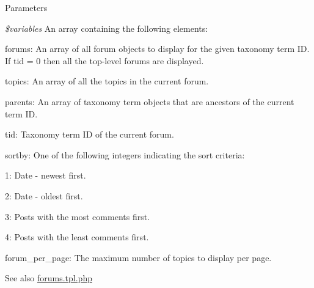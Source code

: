 \begin{DoxyParams}{Parameters}
\item[{\em \$variables}]An array containing the following elements:
\begin{DoxyItemize}
\item forums: An array of all forum objects to display for the given taxonomy term ID. If tid = 0 then all the top-\/level forums are displayed.
\item topics: An array of all the topics in the current forum.
\item parents: An array of taxonomy term objects that are ancestors of the current term ID.
\item tid: Taxonomy term ID of the current forum.
\item sortby: One of the following integers indicating the sort criteria:
\begin{DoxyItemize}
\item 1: Date -\/ newest first.
\item 2: Date -\/ oldest first.
\item 3: Posts with the most comments first.
\item 4: Posts with the least comments first.
\end{DoxyItemize}
\item forum\_\-per\_\-page: The maximum number of topics to display per page.
\end{DoxyItemize}\end{DoxyParams}
\begin{DoxySeeAlso}{See also}
\hyperlink{forums_8tpl_8php}{forums.tpl.php} 
\end{DoxySeeAlso}
